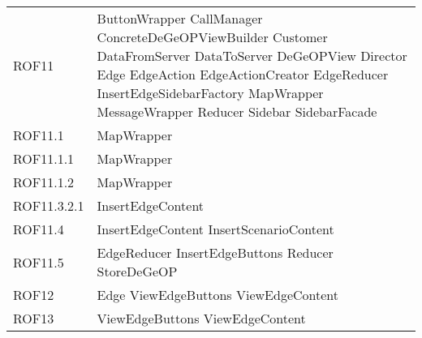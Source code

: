 \begin{longtable}{p{2.5cm}!{\VRule[1pt]}p{5cm}}
		ROF11 & ButtonWrapper \newline CallManager \newline ConcreteDeGeOPViewBuilder \newline Customer \newline DataFromServer \newline DataToServer \newline DeGeOPView \newline Director \newline Edge \newline EdgeAction \newline EdgeActionCreator \newline EdgeReducer \newline InsertEdgeSidebarFactory \newline MapWrapper \newline MessageWrapper \newline Reducer \newline Sidebar \newline SidebarFacade\\
		ROF11.1 & MapWrapper\\
		ROF11.1.1 & MapWrapper\\
		ROF11.1.2 & MapWrapper\\
		ROF11.3.2.1 & InsertEdgeContent\\
		ROF11.4 & InsertEdgeContent \newline InsertScenarioContent\\
		ROF11.5 & EdgeReducer \newline InsertEdgeButtons \newline Reducer \newline StoreDeGeOP\\
		ROF12 & Edge \newline ViewEdgeButtons \newline ViewEdgeContent\\
		ROF13 & ViewEdgeButtons \newline ViewEdgeContent\\

\end{longtable}
